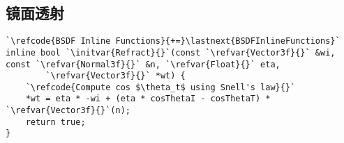 \subsection{镜面透射}\label{sub:镜面透射}
\begin{lstlisting}
`\refcode{BSDF Inline Functions}{+=}\lastnext{BSDFInlineFunctions}`
inline bool `\initvar{Refract}{}`(const `\refvar{Vector3f}{}` &wi, const `\refvar{Normal3f}{}` &n, `\refvar{Float}{}` eta,
        `\refvar{Vector3f}{}` *wt) {
    `\refcode{Compute cos $\theta_t$ using Snell's law}{}`
    *wt = eta * -wi + (eta * cosThetaI - cosThetaT) * `\refvar{Vector3f}{}`(n);
    return true;
}
\end{lstlisting}